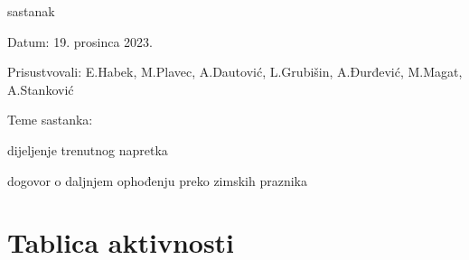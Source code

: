 \begin{packed_enum}
			\item  sastanak
			\item[] \begin{packed_item}
				\item Datum: 19. prosinca 2023.
				\item Prisustvovali: E.Habek, M.Plavec, A.Dautović, L.Grubišin, A.Đurđević, M.Magat, A.Stanković
				\item Teme sastanka:
				\begin{packed_item}
					\item dijeljenje trenutnog napretka
					\item dogovor o daljnjem ophođenju preko zimskih praznika
				\end{packed_item}
			\end{packed_item}
			
		\end{packed_enum}
		
		\eject
		\section*{Tablica aktivnosti}
		
